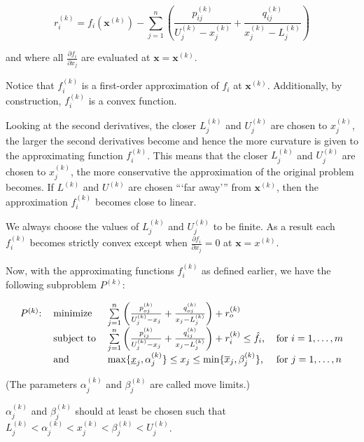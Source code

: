$$r_i^{(k)}=f_i(\mathbf{x}^{(k)})-\sum\limits_{j=1}^{n}\left(\frac{p_{ij}^{(k)}}{U_j^{(k)}-x_j^{(k)}}+\frac{q_{ij}^{(k)}}{x_j^{(k)}-L_j^{(k)}}\right)$$
	
\noindent and where all $\frac{\partial f_i}{\partial x_j}$ are evaluated at $\mathbf{x}=\mathbf{x}^{(k)}$.

Notice that $f_i^{(k)}$ is a first-order approximation of $f_i$ at $\mathbf{x}^{(k)}$. Additionally, by construction, $f_i^{(k)}$ is a convex function.

Looking at the second derivatives, the closer $L_j^{(k)}$ and $U_j^{(k)}$ are chosen to $x_j^{(k)}$, the larger the second derivatives become and hence the more curvature is given to the approximating function $f_i^{(k)}$. This means that the closer $L_j^{(k)}$ and $U_j^{(k)}$ are chosen to $x_j^{(k)}$, the more conservative the approximation of the original problem becomes. If $L^{(k)}$ and $U^{(k)}$ are chosen ```far away''' from $\mathbf{x}^{(k)}$, then the approximation $f_i^{(k)}$ becomes close to linear.

We always choose the values of $L_j^{(k)}$ and $U_j^{(k)}$ to be finite. As a result each $f_i^{(k)}$ becomes strictly convex except when $\frac{\partial f_i}{\partial x_j}=0$ at $\mathbf{x}=x^{(k)}$.

Now, with the approximating functions $f_i^{(k)}$ as defined earlier, we have the following subproblem $P^{(k)}$:

\begin{equation}
	\begin{tabular}{llll}
		$P^{(k)}$: & minimize   & $\sum\limits_{j=1}^{n}\left(\frac{p_{oj}^{(k)}}{U_j^{(k)}-x_j}+\frac{q_{oj}^{(k)}}{x_j-L_j^{(k)}}\right)+r_o^{(k)}$               &                    \\
		           & subject to & $\sum\limits_{j=1}^{n}\left(\frac{p_{ij}^{(k)}}{U_j^{(k)}-x_j}+\frac{q_{ij}^{(k)}}{x_j-L_j^{(k)}}\right)+r_i^{(k)}\leq\hat{f}_i$, & for $i=1,\ldots,m$ \\
		           & and        & $\max\lbrace\underline{x}_j,\alpha_j^{(k)}\rbrace\leq x_j\leq \min\lbrace \overline{x}_j,\beta_j^{(k)}\rbrace$,                   & for $j=1,\ldots,n$ 
	\end{tabular}
\end{equation}

(The parameters $\alpha_j^{(k)}$ and $\beta_j^{(k)}$ are called move limits.)

$\alpha_j^{(k)}$ and $\beta_j^{(k)}$ should at least be chosen such that $L_j^{(k)}<\alpha_j^{(k)}<x_j^{(k)}<\beta_j^{(k)}<U_j^{(k)}$.

